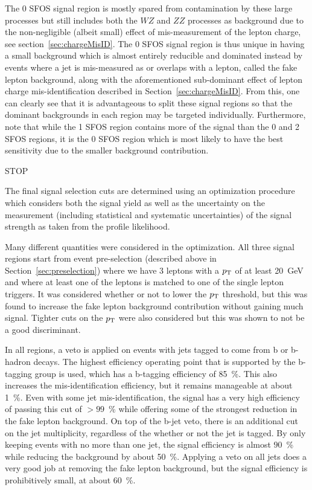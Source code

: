The 0 SFOS signal region is mostly spared from contamination  by 
these large processes but still
includes both the $WZ$ and $ZZ$ processes as background due to the
non-negligible (albeit small) effect of mis-measurement of the lepton
charge, see section~\ref{sec:chargeMisID}.  The 0 SFOS signal region
is thus unique in having a small background which is almost entirely
reducible and dominated instead by events where a jet is mis-measured
as or overlaps with a lepton, called the fake lepton background, along
with the aforementioned sub-dominant effect of lepton charge 
mis-identification described in Section~\ref{sec:chargeMisID}.  
From this, one can clearly see that it is
advantageous to split these signal regions so that the dominant
backgrounds in each region may be targeted individually.  Furthermore,
note that while the 1 SFOS region contains more of the signal than the
0 and 2 SFOS regions, it is the 0 SFOS region which is most likely to
have the best sensitivity due to the smaller background contribution.

STOP

The final signal selection cuts are determined using an optimization
procedure which considers both the signal yield as well as the uncertainty
on the measurement (including statistical and systematic uncertainties)
of the signal strength as taken from the profile likelihood. 

Many different quantities were considered in the optimization.  All three signal 
regions start from event pre-selection (described above in Section~\ref{sec:preselection}) where 
we have 3 leptons with a $p_{\mathrm{T}}$ of at least 20~GeV 
and where at least one of the leptons is matched to one of the single lepton triggers.
It was considered whether or not to lower the $p_{\mathrm{T}}$ threshold, but this was found to increase
the fake lepton background contribution without gaining much signal. Tighter cuts on the $p_{\mathrm{T}}$
were also considered but this was shown to not be a good discriminant. 

In all regions, 
a veto is applied on events with jets tagged to come from b or b-hadron decays. The highest
efficiency operating point that is supported by the b-tagging group is used,
which has a b-tagging efficiency of 85~\%.  This also increases the mis-identification efficiency, 
but it remains manageable at about 1~\%. Even with some jet mis-identification, the signal has
a very high efficiency of passing this cut of $> 99$~\% while offering some of the strongest 
reduction in the fake lepton background. On top of the b-jet veto, there is an additional
cut on the jet multiplicity, regardless of the whether or not the jet is tagged. By only keeping
events with no more than one jet, the signal efficiency is almost $90$~\% while reducing
the background by about 50~\%.  Applying a veto on all jets does a very good job at removing the fake lepton
background, but the signal efficiency is prohibitively small, at about 60~\%. 

